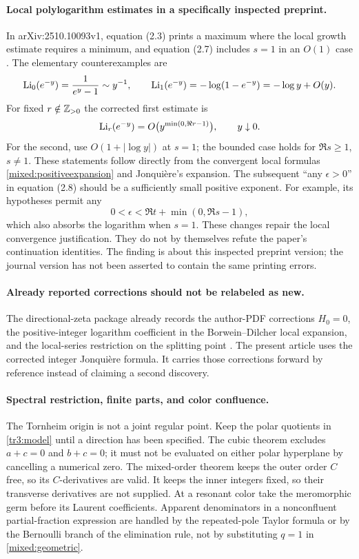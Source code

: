 \paragraph{Local polylogarithm estimates in a specifically inspected preprint.}
In arXiv:2510.10093v1, equation (2.3) prints a maximum where the local
growth estimate requires a minimum, and equation (2.7) includes $s=1$
in an $O(1)$ case \cite{tr3:SS}. The elementary counterexamples are
\[
 \operatorname{Li}_0(e^{-y})=\frac1{e^y-1}\sim y^{-1},\qquad
 \operatorname{Li}_1(e^{-y})=-\log(1-e^{-y})=-\log y+O(y).
\]
For fixed $r\notin\mathbb Z_{>0}$ the corrected first estimate is
\[
 \operatorname{Li}_r(e^{-y})=O\bigl(y^{\min(0,\Re r-1)}\bigr),\qquad y\downarrow0.
\]
For the second, use $O(1+|\log y|)$ at $s=1$; the bounded case
holds for $\Re s\ge1$, $s\ne1$. These statements follow directly
from the convergent local formulas \eqref{mixed:positiveexpansion}
and Jonqui\`ere's expansion.
The subsequent ``any $\epsilon>0$'' in equation (2.8) should be a
sufficiently small positive exponent. For example, its hypotheses
permit any
\[
 0<\epsilon<\Re t+\min(0,\Re s-1),
\]
which also absorbs the logarithm when $s=1$.
These changes repair the local convergence justification. They do not
by themselves refute the paper's continuation identities. The finding
is about this inspected preprint version; the journal version has not
been asserted to contain the same printing errors.

\paragraph{Already reported corrections should not be relabeled as new.}
The directional-zeta package already records the author-PDF corrections
$H_0=0$, the positive-integer logarithm coefficient in the
Borwein--Dilcher local expansion, and the local-series restriction
on the splitting point \cite{RepoDirectional}. The present article
uses the corrected integer Jonqui\`ere formula. It carries those
corrections forward by reference instead of claiming a second discovery.

\paragraph{Spectral restriction, finite parts, and color confluence.}
The Tornheim origin is not a joint regular point. Keep the polar
quotients in \eqref{tr3:model} until a direction has been specified.
The cubic theorem excludes $a+c=0$ and $b+c=0$; it must not be
evaluated on either polar hyperplane by cancelling a numerical zero.
The mixed-order theorem keeps the outer order $C$ free, so its
$C$-derivatives are valid. It keeps the inner integers fixed, so their
transverse derivatives are not supplied. At a resonant color take
the meromorphic germ before its Laurent coefficients. Apparent
denominators in a nonconfluent partial-fraction expression are handled
by the repeated-pole Taylor formula or by the Bernoulli branch of the
elimination rule, not by substituting $q=1$ in \eqref{mixed:geometric}.


